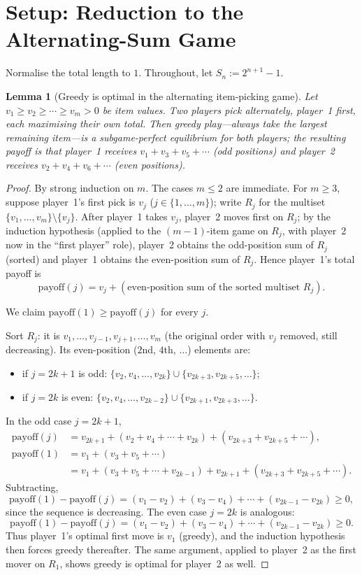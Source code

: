 \documentclass[11pt]{article}
\newtheorem{lemma}[theorem]{Lemma}
\theoremstyle{definition}
\begin{document}
\section{Setup: Reduction to the Alternating-Sum Game}

Normalise the total length to $1$. Throughout, let $S_n:=2^{n+1}-1$.

\begin{lemma}[Greedy is optimal in the alternating item-picking game]\label{lem:greedy}
Let $v_1\ge v_2\ge\cdots\ge v_m>0$ be item values. Two players pick
alternately, player~1 first, each maximising their own total. Then greedy
play---always take the largest remaining item---is a subgame-perfect
equilibrium for \emph{both} players; the resulting payoff is that player~1
receives $v_1+v_3+v_5+\cdots$ (odd positions) and player~2 receives
$v_2+v_4+v_6+\cdots$ (even positions).
\end{lemma}

\begin{proof}
By strong induction on $m$. The cases $m\le 2$ are immediate. For $m\ge 3$,
suppose player~1's first pick is $v_j$ ($j\in\{1,\dots,m\}$); write $R_j$ for
the multiset $\{v_1,\dots,v_m\}\setminus\{v_j\}$. After player~1 takes $v_j$,
player~2 moves first on $R_j$; by the induction hypothesis (applied to the
$(m-1)$-item game on $R_j$, with player~2 now in the ``first player'' role),
player~2 obtains the odd-position sum of $R_j$ (sorted) and player~1 obtains
the even-position sum of $R_j$. Hence player~1's total payoff is
\[
\mathrm{payoff}(j)=v_j+(\text{even-position sum of the sorted multiset }R_j).
\]

We claim $\mathrm{payoff}(1)\ge\mathrm{payoff}(j)$ for every $j$.

Sort $R_j$: it is $v_1,\dots,v_{j-1},v_{j+1},\dots,v_m$ (the original order
with $v_j$ removed, still decreasing). Its even-position ($2$nd, $4$th,
$\dots$) elements are:
\begin{itemize}[leftmargin=2em]
\item if $j=2k+1$ is odd: $\{v_2,v_4,\dots,v_{2k}\}\cup\{v_{2k+3},v_{2k+5},\dots\}$;
\item if $j=2k$ is even: $\{v_2,v_4,\dots,v_{2k-2}\}\cup\{v_{2k+1},v_{2k+3},\dots\}$.
\end{itemize}

In the odd case $j=2k+1$,
\begin{align*}
\mathrm{payoff}(j) &= v_{2k+1}+(v_2+v_4+\cdots+v_{2k})+(v_{2k+3}+v_{2k+5}+\cdots),\\
\mathrm{payoff}(1) &= v_1+(v_3+v_5+\cdots)\\
&= v_1+(v_3+v_5+\cdots+v_{2k-1})+v_{2k+1}+(v_{2k+3}+v_{2k+5}+\cdots).
\end{align*}
Subtracting,
\[
\mathrm{payoff}(1)-\mathrm{payoff}(j)=(v_1-v_2)+(v_3-v_4)+\cdots+(v_{2k-1}-v_{2k})\ge 0,
\]
since the sequence is decreasing. The even case $j=2k$ is analogous:
\[
\mathrm{payoff}(1)-\mathrm{payoff}(j)=(v_1-v_2)+(v_3-v_4)+\cdots+(v_{2k-1}-v_{2k})\ge 0.
\]
Thus player~1's optimal first move is $v_1$ (greedy), and the induction
hypothesis then forces greedy thereafter. The same argument, applied to
player~2 as the first mover on $R_1$, shows greedy is optimal for player~2 as
well.
\end{proof}
\end{document}
